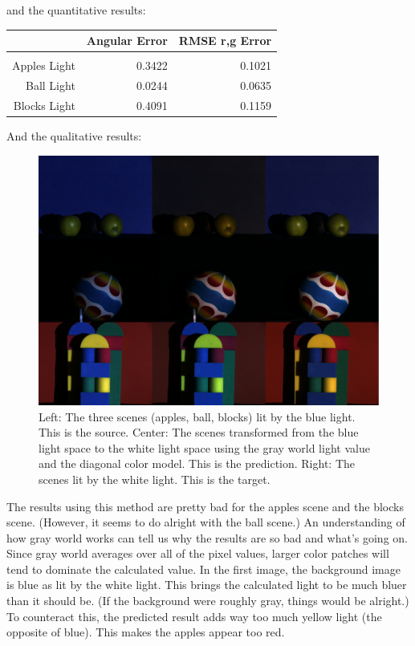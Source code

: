 \documentclass{article}
\begin{document}
and the quantitative results:

\begin{tabular}{r | r r}
                 & Angular Error & RMSE r,g Error \\
    \hline                                        \\
    Apples Light &        0.3422 &         0.1021 \\
      Ball Light &        0.0244 &         0.0635 \\
    Blocks Light &        0.4091 &         0.1159
\end{tabular}

And the qualitative results:

\begin{figure}[!ht]
	\centering
	\includegraphics[width=120mm]{figs/results-grayworld-3x3.png}
	\caption{Left: The three scenes (apples, ball, blocks) lit by the blue light. This is the source. 
        Center: The scenes transformed from the blue light space to the white light space 
        using the gray world light value and the diagonal color model. 
        This is the prediction.
        Right: The scenes lit by the white light. This is the target.}
\end{figure}

The results using this method are pretty bad for the apples scene and the blocks 
scene. (However, it seems to do alright with the ball scene.) An understanding 
of how gray world works can tell us why the results are so bad and what's going 
on. Since gray world averages over all of the pixel values, larger color patches 
will tend to dominate the calculated value. In the first image, the background 
image is blue as lit by the white light. This brings the calculated light to be 
much bluer than it should be. (If the background were roughly gray, things would 
be alright.) To counteract this, the predicted result adds way too much yellow 
light (the opposite of blue). This makes the apples appear too red.
\end{document}

